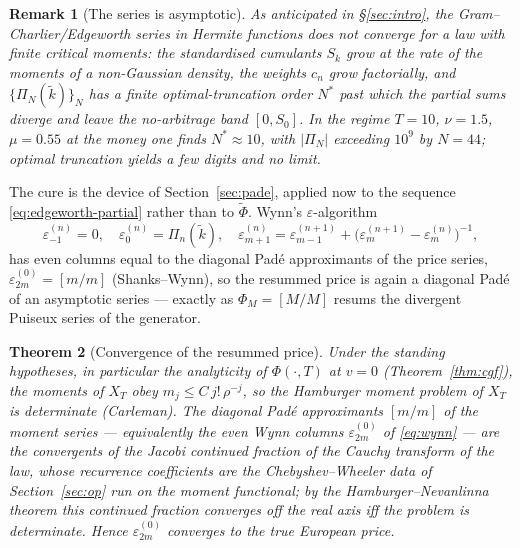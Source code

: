 \documentclass[11pt]{article}
\newtheorem{theorem}{Theorem}[section]
\newtheorem{remark}[theorem]{Remark}
\begin{document}
\begin{remark}[The series is asymptotic]\label{rem:ed-div}
As anticipated in \S\ref{sec:intro}, the Gram--Charlier/Edgeworth series in
Hermite functions does not converge for a law with finite critical moments: the
standardised cumulants $S_k$ grow at the rate of the moments of a non-Gaussian
density, the weights $c_n$ grow factorially, and $\{\Pi_N(\tilde k)\}_N$ has a
finite optimal-truncation order $N^\ast$ past which the partial sums diverge and
leave the no-arbitrage band $[0,S_0]$. In the regime $T=10$, $\nu=1.5$,
$\mu=0.55$ at the money one finds $N^\ast\approx10$, with $|\Pi_N|$ exceeding
$10^{9}$ by $N=44$; optimal truncation yields a few digits and no limit.
\end{remark}

The cure is the device of Section~\ref{sec:pade}, applied now to the sequence
\eqref{eq:edgeworth-partial} rather than to $\widetilde\Phi$. Wynn's
$\varepsilon$-algorithm~\cite{Shanks,Wynn}
\begin{equation}\label{eq:wynn}
\varepsilon^{(n)}_{-1}=0,\quad
\varepsilon^{(n)}_{0}=\Pi_{n}(\tilde k),\quad
\varepsilon^{(n)}_{m+1}=\varepsilon^{(n+1)}_{m-1}
+\bigl(\varepsilon^{(n+1)}_{m}-\varepsilon^{(n)}_{m}\bigr)^{-1},
\end{equation}
has even columns equal to the diagonal Pad\'e approximants of the price series,
$\varepsilon^{(0)}_{2m}=[m/m]$ (Shanks--Wynn), so the resummed price is again a
diagonal Pad\'e of an asymptotic series --- exactly as $\Phi_M=[M/M]$ resums the
divergent Puiseux series of the generator.

\begin{theorem}[Convergence of the resummed price]\label{thm:ed-conv}
Under the standing hypotheses, in particular the analyticity of $\Phi(\cdot,T)$
at $v=0$ \textup{(Theorem~\ref{thm:cgf})}, the moments of $X_T$ obey
$m_j\le C\,j!\,\rho^{-j}$, so the Hamburger moment problem of $X_T$ is
determinate \textup{(Carleman)}. The diagonal Pad\'e approximants $[m/m]$ of the
moment series --- equivalently the even Wynn columns $\varepsilon^{(0)}_{2m}$ of
\eqref{eq:wynn} --- are the convergents of the Jacobi continued fraction of the
Cauchy transform of the law, whose recurrence coefficients are the
Chebyshev--Wheeler data of Section~\ref{sec:op} run on the moment functional; by
the Hamburger--Nevanlinna theorem this continued fraction converges off the real
axis iff the problem is determinate. Hence $\varepsilon^{(0)}_{2m}$ converges to
the true European price.
\end{theorem}
\end{document}
